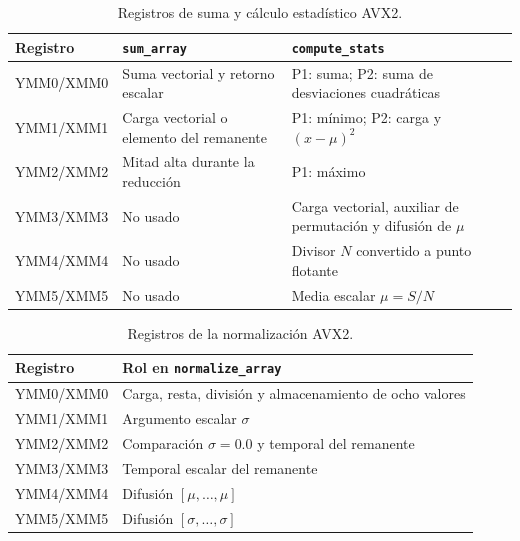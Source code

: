 \documentclass[journal]{IEEEtran}
\begin{document}
\begin{table}[H]
  \centering
  \caption{Registros de suma y cálculo estadístico AVX2.}
  \label{tab:registros-avx2-stats}
  \scriptsize
  \setlength{\tabcolsep}{2.5pt}
  \begin{tabularx}{\columnwidth}{@{}>{\raggedright\arraybackslash}p{}
    >{\raggedright\arraybackslash}p{}
    >{\raggedright\arraybackslash}X@{}}
    \toprule
    Registro & \texttt{sum\_array} & \texttt{compute\_stats} \\
    \midrule
    YMM0/XMM0 & Suma vectorial y retorno escalar & P1: suma; P2: suma de
      desviaciones cuadráticas \\
    YMM1/XMM1 & Carga vectorial o elemento del remanente & P1: mínimo; P2:
      carga y $(x-\mu)^2$ \\
    YMM2/XMM2 & Mitad alta durante la reducción & P1: máximo \\
    YMM3/XMM3 & No usado & Carga vectorial, auxiliar de permutación y difusión
      de $\mu$ \\
    YMM4/XMM4 & No usado & Divisor $N$ convertido a punto flotante \\
    YMM5/XMM5 & No usado & Media escalar $\mu=S/N$ \\
    \bottomrule
  \end{tabularx}
\end{table}

\begin{table}[H]
  \centering
  \caption{Registros de la normalización AVX2.}
  \label{tab:registros-avx2-normalize}
  \scriptsize
  \setlength{\tabcolsep}{3pt}
  \begin{tabularx}{\columnwidth}{@{}>{\raggedright\arraybackslash}p{}
    >{\raggedright\arraybackslash}X@{}}
    \toprule
    Registro & Rol en \texttt{normalize\_array} \\
    \midrule
    YMM0/XMM0 & Carga, resta, división y almacenamiento de ocho valores \\
    YMM1/XMM1 & Argumento escalar $\sigma$ \\
    YMM2/XMM2 & Comparación $\sigma=0.0$ y temporal del remanente \\
    YMM3/XMM3 & Temporal escalar del remanente \\
    YMM4/XMM4 & Difusión $[\mu,\ldots,\mu]$ \\
    YMM5/XMM5 & Difusión $[\sigma,\ldots,\sigma]$ \\
    \bottomrule
  \end{tabularx}
\end{table}
\end{document}
